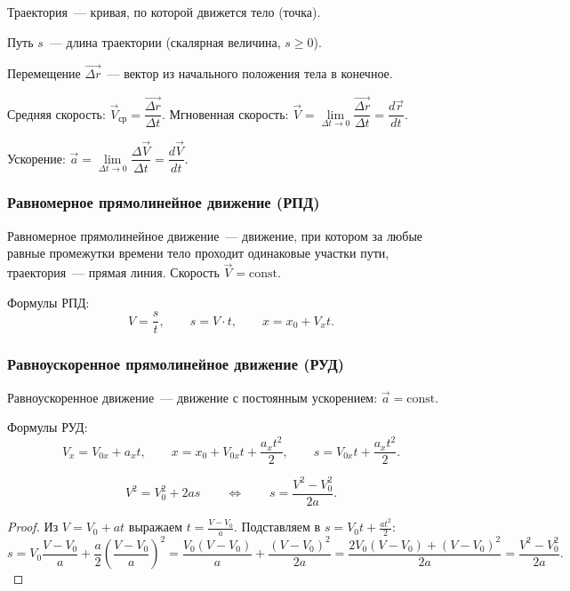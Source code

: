 \documentclass[12pt]{article}
\begin{document}
\begin{definition}
	Траектория~--- кривая, по которой движется тело (точка).
\end{definition}
\begin{definition}
	Путь $s$~--- длина траектории (скалярная величина, $s \geqslant 0$).
\end{definition}
\begin{definition}
	Перемещение $\vec{\Delta r}$~--- вектор из начального положения тела в конечное.
\end{definition}
\begin{definition}
	Средняя скорость: $\vec{V}_{\text{ср}} = \dfrac{\vec{\Delta r}}{\Delta t}$.
	Мгновенная скорость: $\vec{V} = \lim\limits_{\Delta t \to 0} \dfrac{\vec{\Delta r}}{\Delta t} = \dfrac{d\vec{r}}{dt}$.
\end{definition}
\begin{definition}
	Ускорение: $\vec{a} = \lim\limits_{\Delta t \to 0} \dfrac{\Delta \vec{V}}{\Delta t} = \dfrac{d\vec{V}}{dt}$.
\end{definition}

\subsubsection{Равномерное прямолинейное движение (РПД)}

\begin{definition}
	Равномерное прямолинейное движение~--- движение, при котором за любые равные промежутки времени тело проходит одинаковые участки пути, траектория~--- прямая линия. Скорость $\vec{V} = \mathrm{const}$.
\end{definition}

Формулы РПД:
\[
	V = \frac{s}{t}, \qquad s = V \cdot t, \qquad x = x_0 + V_x t.
\]

\subsubsection{Равноускоренное прямолинейное движение (РУД)}

\begin{definition}
	Равноускоренное движение~--- движение с постоянным ускорением: $\vec{a} = \mathrm{const}$.
\end{definition}

Формулы РУД:
\[
	V_x = V_{0x} + a_x t, \qquad
	x = x_0 + V_{0x} t + \frac{a_x t^2}{2}, \qquad
	s = V_{0x} t + \frac{a_x t^2}{2}.
\]

\begin{statement}
	\[
		V^2 = V_0^2 + 2a s \qquad \Longleftrightarrow \qquad s = \frac{V^2 - V_0^2}{2a}.
	\]
\end{statement}
\begin{proof}
	Из $V = V_0 + at$ выражаем $t = \frac{V - V_0}{a}$. Подставляем в $s = V_0 t + \frac{at^2}{2}$:
	\[
		s = V_0 \frac{V - V_0}{a} + \frac{a}{2}\left(\frac{V - V_0}{a}\right)^2
		= \frac{V_0(V - V_0)}{a} + \frac{(V-V_0)^2}{2a}
		= \frac{2V_0(V-V_0) + (V-V_0)^2}{2a}
		= \frac{V^2 - V_0^2}{2a}.
	\]
\end{proof}
\end{document}
